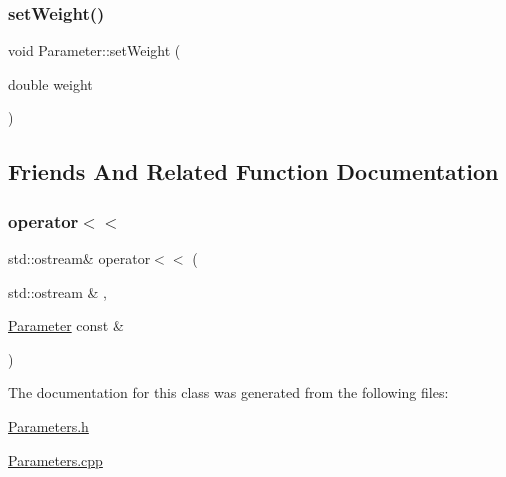 \subsubsection{\texorpdfstring{set\+Weight()}{setWeight()}}
{\footnotesize\ttfamily void Parameter\+::set\+Weight (\begin{DoxyParamCaption}\item[{double}]{weight }\end{DoxyParamCaption})}



\subsection{Friends And Related Function Documentation}
\mbox{\label{classanen_par_1_1_parameter_a062fa105b64c362071304bc5f2eb350a}} 
\subsubsection{\texorpdfstring{operator$<$$<$}{operator<<}}
{\footnotesize\ttfamily std\+::ostream\& operator$<$$<$ (\begin{DoxyParamCaption}\item[{std\+::ostream \&}]{,  }\item[{\mbox{\hyperlink{classanen_par_1_1_parameter}{Parameter}} const \&}]{ }\end{DoxyParamCaption})\hspace{0.3cm}{\ttfamily [friend]}}



The documentation for this class was generated from the following files\+:\begin{DoxyCompactItemize}
\item 
\mbox{\hyperlink{_parameters_8h}{Parameters.\+h}}\item 
\mbox{\hyperlink{_parameters_8cpp}{Parameters.\+cpp}}\end{DoxyCompactItemize}
